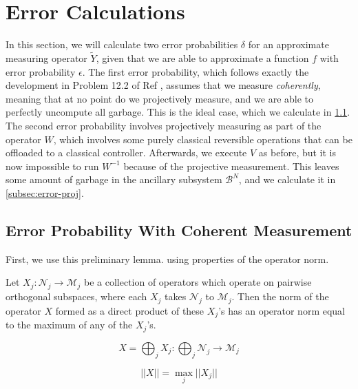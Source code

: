 \section{Error Calculations}

In this section, we will calculate two error probabilities $\delta$ for
an approximate measuring operator $\tilde{Y}$, given that we are able to
approximate a function $f$ with error probability $\epsilon$. The first
error probability, which follows exactly the development in Problem 12.2
of Ref \cite{Kitaev2002}, assumes that we measure \emph{coherently}, meaning
that at no point do we projectively measure, and we are able to perfectly
uncompute all garbage. This is the ideal case, which we calculate in
\ref{subsec:error-noproj}. The second error probability
involves projectively measuring as part of the operator $W$,
which involves some purely classical reversible operations that can be
offloaded to a classical controller. Afterwards, we execute $V$ as before,
but it is now impossible to run $W^{-1}$ because of the projective measurement.
This leaves some amount of garbage in the ancillary
subsystem $\mathcal{B}^N$, and we calculate it in \ref{subsec:error-proj}.

\subsection{Error Probability With Coherent Measurement}
\label{subsec:error-noproj}

First, we use this preliminary lemma. using properties of
the operator norm.

\begin{lemma}
\label{lemma:sum-norm}
Let $X_j : \mathcal{N}_j \rightarrow \mathcal{M}_j $
be a collection of operators which operate on pairwise orthogonal
subspaces, where each $X_j$ takes $\mathcal{N}_j$ to $\mathcal{M}_j$.
Then the norm of the operator $X$ formed as a direct product of these
$X_j$'s has an operator norm equal to the maximum of any of the
$X_j$'s.

\begin{equation}
X = \bigoplus_j X_j : \bigoplus_j \mathcal{N}_j \rightarrow \mathcal{M}_j
\end{equation}

\begin{equation}
|| X || = \max_{j} ||X_j||
\end{equation}
\end{lemma}

